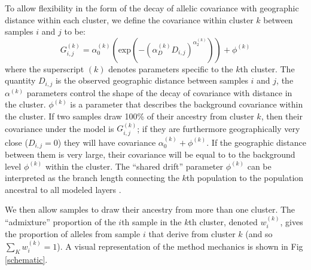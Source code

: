 \documentclass[12pt]{article}
\newcommand{\gc}[1]{{\it\color{blue}{(#1)}}}
\begin{document}
To allow flexibility in the form of the decay of allelic covariance with geographic distance within each cluster, 
we define the covariance within cluster $k$ between samples $i$ and $j$ to be:
\begin{equation}
G^{(k)}_{i,j} 
    = 
    \alpha^{(k)}_0 \left( \text{exp} \left( -(\alpha^{(k)}_D D_{i,j}) ^ {\alpha^{(k)}_2}	\right) \right) + \phi^{(k)}
\label{within_cluster_covariance}
\end{equation}
where the superscript $(k)$ denotes parameters specific to the $k$th cluster.
The quantity $D_{i,j}$ is the observed geographic distance between samples $i$ and $j$,
the $\alpha^{(k)}$ parameters control the shape of the decay of
covariance with distance in the cluster.
\gc{Our choice of a powered-exponential decay, as parameterized by the
  $\alpha$s, is a flexible, and standard choice in spatial statistics
  REF, and is not chosen to match  a particular population genetics model. 
The} $\phi^{(k)}$ is a parameter that describes the background covariance within the cluster. 
If two samples draw 100\% of their ancestry from cluster $k$, then their covariance under the model is $G^{(k)}_{i,j}$;
if they are furthermore geographically very close ($D_{i,j}=0$)
they will have covariance $\alpha^{(k)}_0 +  \phi^{(k)}$.
If the geographic distance between them is very large, 
their covariance will be equal to to the background level $\phi^{(k)}$ within the cluster.
The ``shared drift'' parameter $\phi^{(k)}$ can be interpreted as the branch length 
connecting the $k$th population to the population ancestral to all modeled
layers \citep[see for example ][]{patterson_ancient_2012, peter_fstats}.

We then allow samples to draw their ancestry from more than one cluster.
The ``admixture'' proportion of the $i$th sample in the $k$th cluster, denoted $w^{(k)}_i$,
gives the \gc{genome-wide} proportion of alleles from sample $i$ that derive from
cluster $k$ (and so $\sum_K w^{(k)}_i =1$).
A visual representation of the method mechanics is shown in Fig \ref{schematic}.
\end{document}

